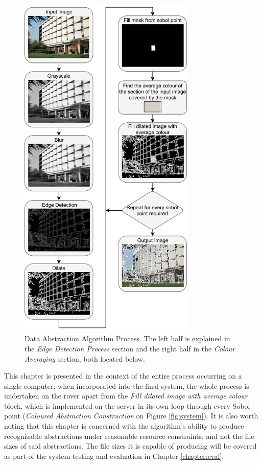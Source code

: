 \begin{figure}[H]
    \begin{center}
      \includegraphics[width=0.75\textwidth]{Figures/Abstraction.jpg}
      \caption[Data Abstraction Algorithm Process]{Data Abstraction Algorithm Process. The left half is explained in the \emph{Edge Detection Process} section and the right half in the \emph{Colour Averaging} section, both located below.}
      \label{fig:process}
    \end{center}
\end{figure}

This chapter is presented in the context of the entire process occurring on a single computer; when incorporated into the final system, the whole process is undertaken on the rover apart from the \emph{Fill dilated image with average colour} block, which is implemented on the server in its own loop through every Sobol point (\emph{Coloured Abstraction Construction} on Figure \ref{fig:system}). It is also worth noting that this chapter is concerned with the algorithm's ability to produce recognisable abstractions under reasonable resource constraints, and not the file sizes of said abstractions. The file sizes it is capable of producing will be covered as part of the system testing and evaluation in Chapter \ref{chapter:eval}.

